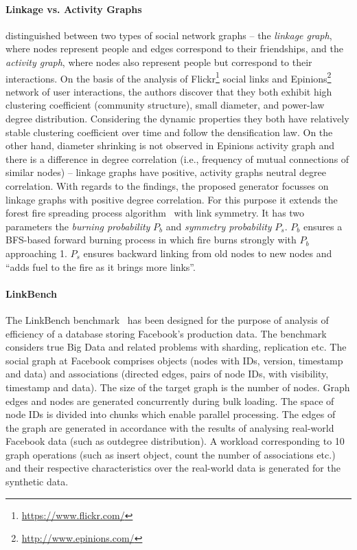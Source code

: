 \paragraph{Linkage vs. Activity Graphs} \cite{Yao2011} distinguished between two
types of social network graphs -- the \emph{linkage graph}, where nodes represent people and edges correspond to their friendships, and the \emph{activity graph}, where nodes also represent people but correspond to their interactions. On the basis of the analysis of
Flickr\footnote{\url{https://www.flickr.com/}} social links and
Epinions\footnote{\url{http://www.epinions.com/}} network of user interactions, the authors discover that they both exhibit high clustering coefficient (community structure), small diameter, and power-law degree distribution. Considering the dynamic properties they both have relatively stable clustering coefficient over time and follow the densification law. On the other hand, diameter shrinking is not observed in Epinions activity graph and there is a difference in degree
correlation (i.e., frequency of mutual connections of similar nodes) -- linkage graphs have positive, activity graphs neutral degree correlation. With regards to the findings, the proposed generator focusses on linkage graphs with positive degree correlation. For this purpose it extends the forest fire spreading process algorithm~\cite{Leskovec:2005:GOT:1081870.1081893} with
link symmetry. It has two parameters the \emph{burning probability} $P_b$ and \emph{symmetry probability} $P_s$. $P_b$ ensures a BFS-based forward burning process in which fire burns strongly with $P_b$ approaching 1.  $P_s$ ensures backward linking from old nodes to new nodes and ``adds fuel to the fire as it brings more links''. %


\paragraph{LinkBench} The LinkBench
benchmark~\cite{Armstrong:2013:LDB:2463676.2465296} has been designed for the purpose of analysis of efficiency of a database storing Facebook's production data. The benchmark considers true Big Data and related problems with sharding, replication etc. The social graph at Facebook comprises objects (nodes with IDs, version, timestamp and data) and associations (directed edges, pairs of node IDs, with visibility, timestamp and data). The size of the target graph is the number of nodes. Graph edges and nodes are generated concurrently during bulk loading. The space of node IDs is divided into chunks which enable parallel processing. The edges of the graph are generated in accordance with the results of analysing  real-world Facebook data (such as outdegree distribution). A workload corresponding to 10 graph operations (such as insert object, count the number of associations etc.) and their respective characteristics over the real-world data is generated for the synthetic data.

